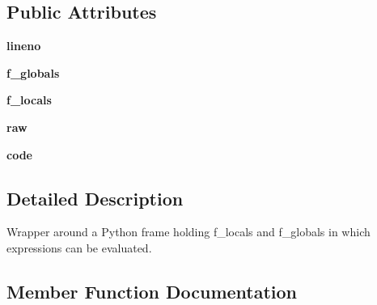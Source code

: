 \subsection*{Public Attributes}
\begin{DoxyCompactItemize}
\item 
\mbox{\label{class__pytest_1_1__code_1_1code_1_1_frame_a7529318869835c1bc4f0c7abfa065891}} 
{\bfseries lineno}
\item 
\mbox{\label{class__pytest_1_1__code_1_1code_1_1_frame_a68da818f46faea3a6a6f42f576f22566}} 
{\bfseries f\+\_\+globals}
\item 
\mbox{\label{class__pytest_1_1__code_1_1code_1_1_frame_ac913dad3d015951a95f26763066a574e}} 
{\bfseries f\+\_\+locals}
\item 
\mbox{\label{class__pytest_1_1__code_1_1code_1_1_frame_ade834df7929797143b04d98e8adacb9f}} 
{\bfseries raw}
\item 
\mbox{\label{class__pytest_1_1__code_1_1code_1_1_frame_afff8ef80a5482ca933b3f8d4a86b21aa}} 
{\bfseries code}
\end{DoxyCompactItemize}


\subsection{Detailed Description}
\begin{DoxyVerb}Wrapper around a Python frame holding f_locals and f_globals
in which expressions can be evaluated.\end{DoxyVerb}
 

\subsection{Member Function Documentation}
\mbox{\label{class__pytest_1_1__code_1_1code_1_1_frame_a2483073f398cacd7ec6b9c6b9b2fa506}} 
